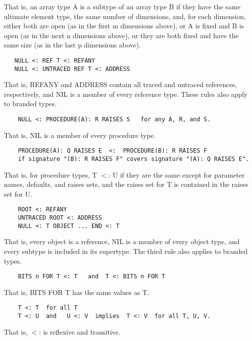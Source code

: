 \documentclass[10pt]{article}
\begin{document}
  That is, an array type A is a subtype of an array type B if they have the same ultimate element type, the same number of dimensions, and, for each dimension, either both are open (as in the first m dimensions above), or A is fixed and B is open (as in the next n dimensions above), or they are both fixed and have the same size (as in the last p dimensions above). 


  
\begin{verbatim}
   NULL <: REF T <: REFANY
   NULL <: UNTRACED REF T <: ADDRESS
\end{verbatim}
 


  That is, REFANY and ADDRESS contain all traced and untraced references, respectively, and NIL is a member of every reference type. These rules also apply to branded types. 


  
\begin{verbatim}
    NULL <: PROCEDURE(A): R RAISES S   for any A, R, and S.
\end{verbatim}
  That is, NIL is a member of every procedure type. 


 
\begin{verbatim}
    PROCEDURE(A): Q RAISES E  <:  PROCEDURE(B): R RAISES F
    if signature "(B): R RAISES F" covers signature "(A): Q RAISES E".
\end{verbatim}
 That is, for procedure types, T $<$: U if they are the same except for parameter names, defaults, and raises sets, and the raises set for T is contained in the raises set for U. 


  
\begin{verbatim}
    ROOT <: REFANY
    UNTRACED ROOT <: ADDRESS
    NULL <: T OBJECT ... END <: T
\end{verbatim}
  That is, every object is a reference, NIL is a member of every object type, and every subtype is included in its supertype. The third rule also applies to branded types. 


  
\begin{verbatim}
    BITS n FOR T <: T   and  T <: BITS n FOR T
\end{verbatim}
  That is, BITS FOR T has the same values as T. 


 
\begin{verbatim}
    T <: T  for all T
    T <: U  and   U <: V  implies  T <: V  for all T, U, V.
\end{verbatim}
 That is, $<$: is reflexive and transitive. 
\end{document}
